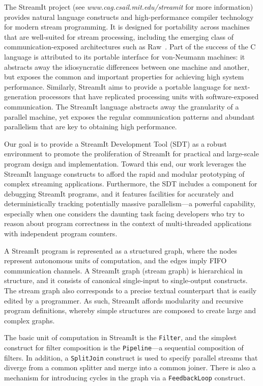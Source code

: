 \documentclass{csailabstractbook}
\begin{document}
The  StreamIt  project  (see {\it www.cag.csail.mit.edu/streamit}  for  more
information) provides natural language constructs and high-performance
compiler technology for modern  stream programming. It is designed for
portability   across  machines   that  are   well-suited   for  stream
processing,  including  the  emerging class  of  communication-exposed
architectures such  as Raw~\cite{raw}.  Part  of the success of  the C
language  is  attributed to  its  portable  interface for  von-Neumann
machines: it abstracts away  the idiosyncratic differences between one
machine and  another, but exposes the common  and important properties
for achieving  high system  performance.  Similarly, StreamIt  aims to
provide a  portable language for next-generation  processors that have
replicated processing units  with software-exposed communication.  The
StreamIt  language  abstracts  away  the  granularity  of  a  parallel
machine, yet  exposes the regular communication  patterns and abundant
parallelism that are key to obtaining high performance.

Our goal is  to provide a StreamIt Development Tool  (SDT) as a robust
environment to promote the proliferation of StreamIt for practical and
large-scale program  design and  implementation. Toward this  end, our
work leverages  the StreamIt language  constructs to afford  the rapid
and      modular       prototyping      of      complex      streaming
applications. Furthermore, the SDT  includes a component for debugging
StreamIt  programs,  and it  features  facilities  for accurately  and
deterministically   tracking   potentially   massive   parallelism---a
powerful capability,  especially when one considers  the daunting task
facing developers who  try to reason about program  correctness in the
context of multi-threaded applications with independent program counters.


A StreamIt  program is  represented as a  structured graph,  where the
nodes represent autonomous units  of computation, and the edges imply
FIFO  communication  channels.  A  StreamIt graph  (stream  graph)  is
hierarchical in  structure, and it consists  of canonical single-input
to single-output  constructs. The stream  graph also corresponds  to a
precise textual counterpart that is easily edited by a programmer.  As
such, StreamIt  affords modularity and  recursive program definitions,
whereby  simple structures are  composed to  create large  and complex
graphs.

The basic unit of computation in StreamIt is the {\tt Filter}, and the
simplest construct  for filter  composition is the  {\tt Pipeline}---a
sequential  composition of  filters.  In  addition, a  {\tt SplitJoin}
construct  is used  to specify  parallel streams  that diverge  from a
common  splitter and  merge  into a  common  joiner. There  is also  a
mechanism for introducing cycles in the graph via a {\tt FeedbackLoop}
construct.
\end{document}
